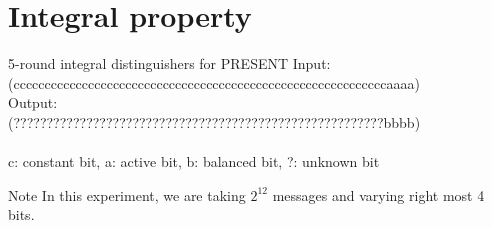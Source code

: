 \section{Integral property}

\begin{frame}{5-round integral distinguishers for PRESENT}
Input:\\(ccccccccccccccccccccccccccccccccccccccccccccccccccccccccccccaaaa)\\
Output:\\(????????????????????????????????????????????????????????bbbb)\\\\
c: constant bit, a: active bit, b: balanced bit, ?: unknown bit\\
\begin{block}{Note}
     In this experiment, we are taking $2^{12}$ messages and varying right most 4 bits.
\end{block}
\end{frame}